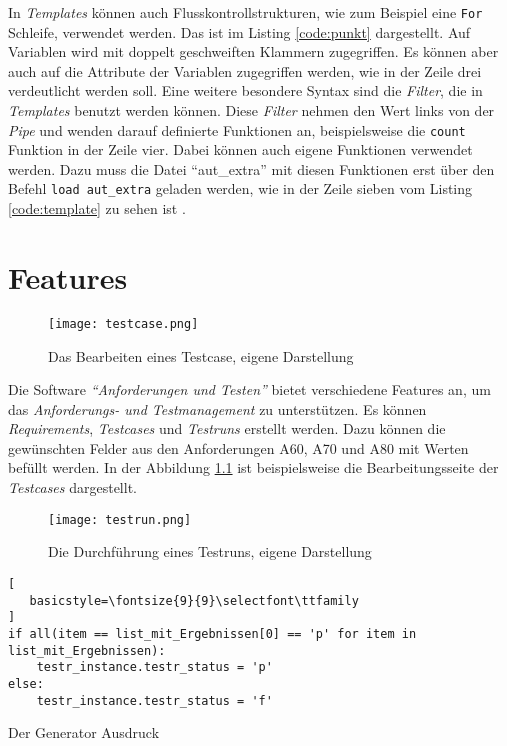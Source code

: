 \documentclass[11pt,a4paper]{report}
\begin{document}
In \textit{Templates} können auch Flusskontrollstrukturen, wie zum Beispiel eine \verb|For| Schleife, verwendet werden. Das ist im Listing \ref{code:punkt} dargestellt. Auf Variablen wird mit doppelt geschweiften Klammern zugegriffen. Es können aber auch auf die Attribute der Variablen zugegriffen werden, wie in der Zeile drei verdeutlicht werden soll. Eine weitere besondere Syntax sind die \textit{Filter}, die in \textit{Templates} benutzt werden können. Diese \textit{Filter} nehmen den Wert links von der \textit{Pipe} und wenden darauf definierte Funktionen an, beispielsweise die \verb|count| Funktion in der Zeile vier. Dabei können auch eigene Funktionen verwendet werden. Dazu muss die Datei "`aut\_extra"' mit diesen Funktionen erst über den Befehl \verb|load aut_extra| geladen werden, wie in der Zeile sieben vom Listing \ref{code:template} zu sehen ist \cite{djangotuto1}.





\chapter{Features}


\begin{figure}[htpb]
  \centering
  \texttt{[image: testcase.png]}
  \caption{Das Bearbeiten eines Testcase, eigene Darstellung}
  \label{f:testcase}
\end{figure}




Die Software \textit{"`Anforderungen und Testen"'} bietet verschiedene Features an, um das \textit{Anforderungs- und Testmanagement} zu unterstützen. Es können \textit{Requirements}, \textit{Testcases} und \textit{Testruns} erstellt werden. Dazu können die gewünschten Felder aus den Anforderungen A60, A70 und A80 mit Werten befüllt werden. In der Abbildung \ref{f:testcase} ist beispielsweise die Bearbeitungsseite der \textit{Testcases} dargestellt.



\begin{figure}[htpb]
  \centering
  \texttt{[image: testrun.png]}
  \caption{Die Durchführung eines Testruns, eigene Darstellung}
  \label{f:testrun}
\end{figure}


\begin{listing}[htbp]
\begin{lstlisting}[
   basicstyle=\fontsize{9}{9}\selectfont\ttfamily
]
if all(item == list_mit_Ergebnissen[0] == 'p' for item in list_mit_Ergebnissen):
	testr_instance.testr_status = 'p'
else:
	testr_instance.testr_status = 'f'   
\end{lstlisting}
\caption{Der Generator Ausdruck}
\label{code:allsam}
\end{listing}
\end{document}
